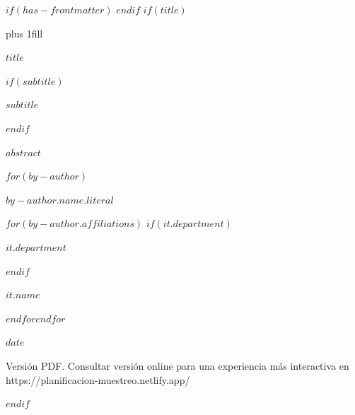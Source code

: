 $if(has-frontmatter)$
\frontmatter
$endif$
$if(title)$
\cleardoublepage
\thispagestyle{empty}
{\centering
\hbox{}\vskip 0cm plus 1fill
{\Huge\bfseries $title$ \par}
$if(subtitle)$
\vspace{3ex}
{\Large\bfseries $subtitle$ \par}
$endif$
\vspace{3ex}
{\bfseries\large $abstract$ \par}
\vspace{12ex}
$for(by-author)$
{\Large\bfseries $by-author.name.literal$ \par}
\vspace{3ex}
$for(by-author.affiliations)$%
$if(it.department)$%
{\bfseries\large $it.department$ \par}
\vspace{3ex}
$endif$%
{\bfseries\large $it.name$ \par}
\vspace{12ex}
$endfor$$endfor$%
\vspace{12ex}
{\bfseries\large $date$ \par}
\vspace{12ex}
{\small Versión PDF. Consultar versión online para una experiencia más interactiva en https://planificacion-muestreo.netlify.app/ \par}
}
$endif$

\let\mainmatterreal\mainmatter
\let\mainmatter\relax